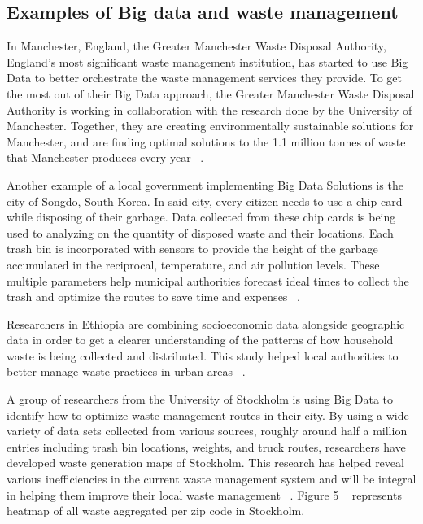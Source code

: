 \documentclass[sigconf]{acmart}
\begin{document}
\subsection{ Examples of Big data and waste management}

In Manchester, England, the Greater Manchester Waste Disposal Authority, England's most significant waste management institution, has started to use Big Data to better orchestrate the waste management services they provide. To get the most out of their Big Data approach, the Greater Manchester Waste Disposal Authority is working in collaboration with the research done by the University of Manchester. Together, they are creating environmentally sustainable solutions for Manchester, and are finding optimal solutions to the 1.1 million tonnes of waste that Manchester produces every year ~\cite{markvan2016}. 

Another example of a local government implementing Big Data Solutions is the city of  Songdo, South Korea. In said city, every citizen needs to use a chip card while disposing of their garbage. Data collected from these chip cards is being used to analyzing on the quantity of disposed waste and their locations. Each trash bin is incorporated with sensors to provide the height of the garbage accumulated in the reciprocal, temperature, and air pollution levels. These multiple parameters help municipal authorities forecast ideal times to collect the trash and optimize the routes to save time and expenses ~\cite{markvan2016}.

Researchers in Ethiopia are combining socioeconomic data alongside geographic data in order to get a clearer understanding of the patterns of how household waste is being collected and distributed. This study helped local authorities to better manage waste practices in urban areas ~\cite{markvan2016}. 

A group of researchers from the University of Stockholm is using Big Data to identify how to optimize waste management routes in their city. By using a wide variety of data sets collected from various sources, roughly around half a million entries including trash bin locations, weights, and truck routes, researchers have developed waste generation maps of Stockholm. This research has helped reveal various inefficiencies in the current waste management system and will be integral in helping them improve their local waste management ~\cite{markvan2016}.
Figure 5 ~\cite{shahrokni2014big} represents heatmap of all waste aggregated per zip code in Stockholm.
\end{document}
